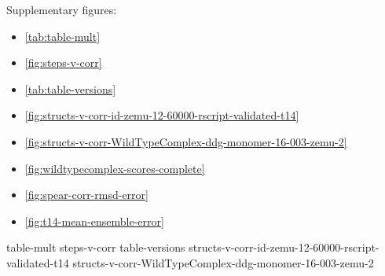 

Supplementary figures:
\begin{itemize}
\item \cref{tab:table-mult}
\item \cref{fig:steps-v-corr}
\item \cref{tab:table-versions}
\item \cref{fig:structs-v-corr-id-zemu-12-60000-rscript-validated-t14}
\item \cref{fig:structs-v-corr-WildTypeComplex-ddg-monomer-16-003-zemu-2}
\item \cref{fig:wildtypecomplex-scores-complete}
\item \cref{fig:spear-corr-rmsd-error}
\item \cref{fig:t14-mean-ensemble-error}
\end{itemize}

{table-mult}
{steps-v-corr}
{table-versions}
{structs-v-corr-id-zemu-12-60000-rscript-validated-t14}
{structs-v-corr-WildTypeComplex-ddg-monomer-16-003-zemu-2}

